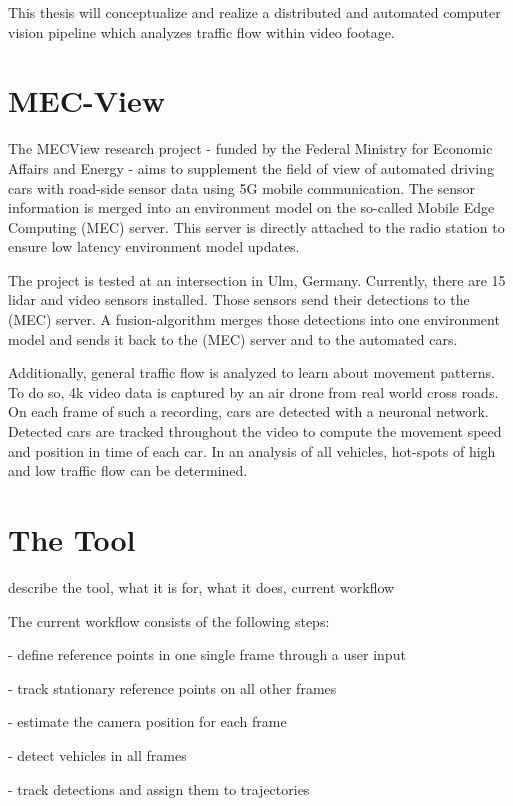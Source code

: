 This thesis will conceptualize and realize a distributed and automated computer vision pipeline which analyzes traffic flow within video footage.



\section{MEC-View}

The MECView research project - funded by the Federal Ministry for Economic Affairs and Energy - aims to supplement the field of view of automated driving cars with road-side sensor data using 5G mobile communication. The sensor information is merged into an environment model on the so-called Mobile Edge Computing (MEC) server. This server is directly attached to the radio station to ensure low latency environment model updates.

The project is tested at an intersection in Ulm, Germany.
Currently, there are 15 lidar and video sensors installed.
Those sensors send their detections to the (MEC) server.
A fusion-algorithm merges those detections into one environment model and sends it back to the (MEC) server and to the automated cars.

Additionally, general traffic flow is analyzed to learn about movement patterns.
To do so, 4k video data is captured by an air drone from real world cross roads.
On each frame of such a recording, cars are detected with a neuronal network.
Detected cars are tracked throughout the video to compute the movement speed and position in time of each car.
In an analysis of all vehicles, hot-spots of high and low traffic flow can be determined.


\section{The Tool}

describe the tool, what it is for, what it does, current workflow

The current workflow consists of the following steps:

- define reference points in one single frame through a user input

- track stationary reference points on all other frames

- estimate the camera position for each frame

- detect vehicles in all frames

- track detections and assign them to trajectories

